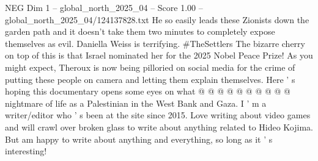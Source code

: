 \begin{textsample}{NEG Dim 1 – global\_north\_2025\_04 – Score 1.00 – global\_north\_2025\_04/124137828.txt}
He so easily leads these Zionists down the garden path and it doesn't take them two minutes to completely expose themselves as evil.
Daniella Weiss is terrifying. \#TheSettlers The bizarre cherry on top of this is that Israel nominated her for the 2025 Nobel Peace Prize!
As you might expect, Theroux is now being pilloried on social media for the crime of putting these people on camera and letting them explain themselves.
Here ' s hoping this documentary opens some eyes on what @ @ @ @ @ @ @ @ @ @ nightmare of life as a Palestinian in the West Bank and Gaza.
I ' m a writer/editor who ' s been at the site since 2015.
Love writing about video games and will crawl over broken glass to write about anything related to Hideo Kojima.
But am happy to write about anything and everything, so long as it ' s interesting!

\end{textsample}
